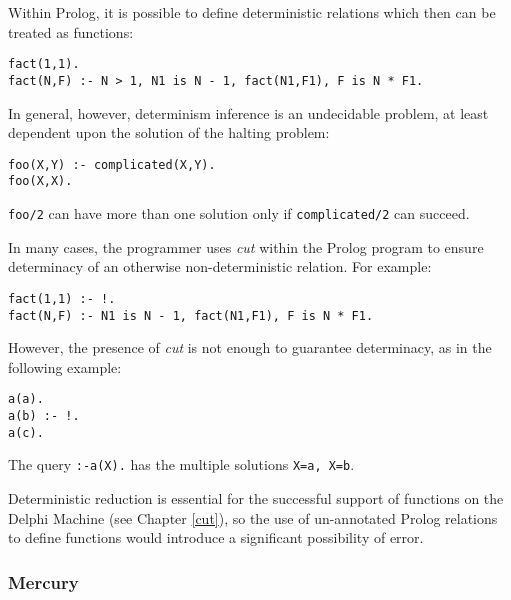 Within Prolog, it is possible to define deterministic relations which then
can be treated as functions:

\begin{verbatim}
fact(1,1).
fact(N,F) :- N > 1, N1 is N - 1, fact(N1,F1), F is N * F1.
\end{verbatim}

In general, however, determinism inference is an undecidable problem, at
least dependent upon the solution of the halting problem:

\begin{verbatim}
foo(X,Y) :- complicated(X,Y).
foo(X,X).
\end{verbatim}

\texttt{foo/2} can have more than one solution only if
\texttt{complicated/2} can succeed.

In many cases, the programmer uses \textit{cut} within the Prolog
program to ensure determinacy of an otherwise non-deterministic
relation. For example:

\begin{verbatim}
fact(1,1) :- !.
fact(N,F) :- N1 is N - 1, fact(N1,F1), F is N * F1.
\end{verbatim}

However, the presence of \textit{cut} is not enough to
guarantee determinacy, as in the following example:

\begin{verbatim}
a(a).
a(b) :- !.
a(c).
\end{verbatim}

The query \texttt{:-a(X).} has the multiple solutions
\texttt{X=a, X=b}.

Deterministic reduction is essential for the successful
support of functions on the Delphi Machine (see Chapter
\ref{cut}), so the use of un-annotated Prolog relations to define
functions would introduce a significant possibility of error.

\subsubsection{Mercury}

